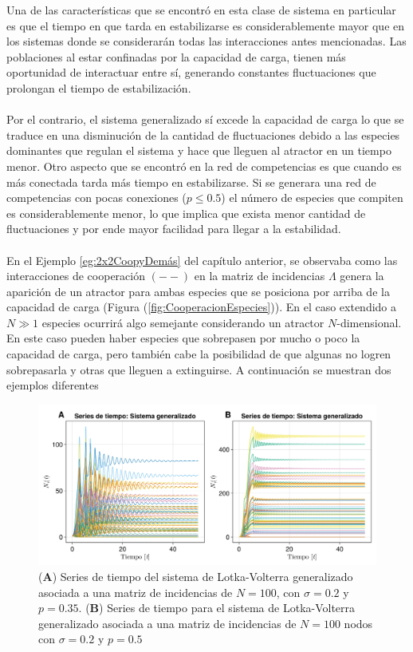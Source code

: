 Una de las características que se encontró en esta clase de sistema en particular es que el tiempo en que tarda en estabilizarse es considerablemente mayor que en los sistemas donde se considerarán todas las interacciones antes mencionadas. Las poblaciones al estar confinadas por la capacidad de carga, tienen más oportunidad de interactuar entre sí, generando constantes fluctuaciones que prolongan el tiempo de estabilización.\\
\\
Por el contrario, el sistema generalizado sí excede la capacidad de carga lo que se traduce en una disminución de la cantidad de fluctuaciones debido a las especies dominantes que regulan el sistema y hace que lleguen al atractor en un tiempo menor. Otro aspecto que se encontró en la red de competencias es que cuando es más conectada tarda más tiempo en estabilizarse. Si se generara una red de competencias con pocas conexiones ($p\leq 0.5$) el número de especies que compiten es considerablemente menor, lo que implica que exista menor cantidad de fluctuaciones y por ende mayor facilidad para llegar a la estabilidad.\\
\\
En el Ejemplo \ref{eg:2x2CoopyDemás} del capítulo anterior, se observaba como las interacciones de cooperación $(--)$ en la matriz de incidencias $\Lambda$ genera la aparición de un atractor para ambas especies que se posiciona por arriba de la capacidad de carga (Figura (\ref{fig:CooperacionEspecies})). En el caso extendido a $N\gg 1$ especies ocurrirá algo semejante considerando un atractor $N$-dimensional. En este caso pueden haber especies que sobrepasen por mucho o poco la capacidad de carga, pero también cabe la posibilidad de que algunas no logren sobrepasarla y otras que lleguen a extinguirse. A continuación se muestran dos ejemplos diferentes
\begin{figure}[h!]
	\centering
	\includegraphics[scale=0.23]{../Imagenes/Series de Tiempo LK100}
	\caption{(\textbf{A}) Series de tiempo del sistema de Lotka-Volterra generalizado asociada a una matriz de incidencias de $N=100$, con $\sigma=0.2$ y $p=0.35$. (\textbf{B}) Series de tiempo para el sistema de Lotka-Volterra generalizado asociada a una matriz de incidencias de $N=100$ nodos con $\sigma=0.2$ y $p=0.5$}
	\label{fig:SeriesdeTiempoLK100}
\end{figure}

